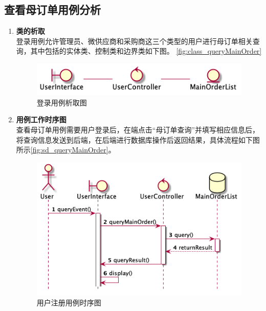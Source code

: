 	\subsection{查看母订单用例分析} %
	\label{sub:查看母订单用例分析}
	\begin{enumerate}
		\item \textbf{类的析取} \\
		登录用例允许管理员、微供应商和采购商这三个类型的用户进行母订单相关查询，其中包括的实体类、控制类和边界类如下图。
		\autoref{fig:class_queryMainOrder}
		\begin{figure}[htp]
		    \centering
		    \includegraphics[width=12cm]{misc/figure_src/class_diagram/queryMainOrder.png}
		    \caption{登录用例析取图}
		    \label{fig:class_queryMainOrder}
		\end{figure}

		\item \textbf{用例工作时序图} \\
		查看母订单用例需要用户登录后，在端点击“母订单查询”并填写相应信息后，将查询信息发送到后端，在后端进行数据库操作后返回结果，具体流程如下图所示\autoref{fig:sd_queryMainOrder}。

		\begin{figure}[htp]
		    \centering
		    \includegraphics[width=12cm]{misc/figure_src/sequence_diagram/sd_queryMainOrder.png}
		    \caption{用户注册用例时序图}
		    \label{fig:sd_queryMainOrder}
		\end{figure}

	\end{enumerate}
	
